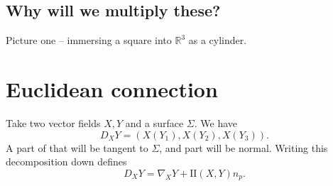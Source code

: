 \subsection{Why will we multiply these?}

Picture one -- immersing a square into \( \mathbb{R}^3 \) as a cylinder.

\section{Euclidean connection}

Take two vector fields \( X, Y  \) and a surface \( \Sigma \). We have
\[ 
    D_X Y = (X(Y_1), X(Y_2), X(Y_3)). 
\]
A part of that will be tangent to \( \Sigma \), and part will be normal. Writing this decomposition down defines
\[ 
    D_X Y = \nabla_X Y + \mathrm{I\!I}(X,Y) n_p.
\]
